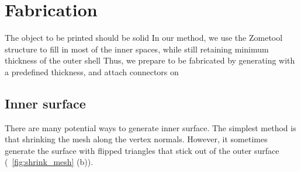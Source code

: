 \section{Fabrication}
\label{sec:fab}
The object to be printed should be solid 
In our method, we use the Zometool structure to fill in most of the inner spaces, while still retaining  minimum thickness of the outer shell  
Thus, we prepare  to be fabricated by generating  with a predefined thickness, and attach connectors on 
    
\subsection{Inner surface}
There are many potential ways to generate  inner surface. 
The simplest method is that shrinking the mesh along the vertex normals.
However, it sometimes generate the surface with flipped triangles that stick out of the outer surface (\figname~\ref{fig:shrink_mesh} (b)).


